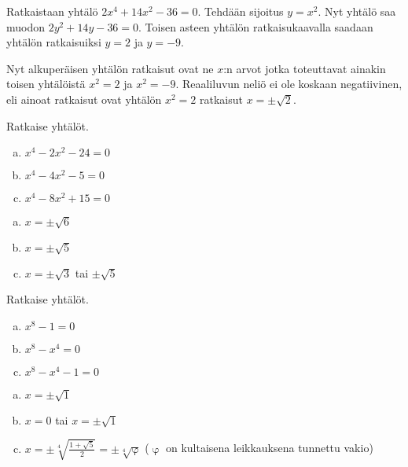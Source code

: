 \begin{esimerkki}
Ratkaistaan yhtälö $2x^4+14x^2-36=0$. Tehdään sijoitus $y = x^2$. Nyt yhtälö saa muodon $2y^2+14y-36 = 0$. Toisen asteen yhtälön ratkaisukaavalla saadaan yhtälön ratkaisuiksi $y = 2$ ja $y = -9$.

Nyt alkuperäisen yhtälön ratkaisut ovat ne $x$:n arvot jotka toteuttavat ainakin toisen yhtälöistä $x^2 = 2$ ja $x^2 = -9$. Reaaliluvun neliö ei ole koskaan negatiivinen, eli ainoat ratkaisut ovat yhtälön $x^2 = 2$ ratkaisut $x = \pm\sqrt{2}$.
\end{esimerkki}

\Harjoitustehtavat

\begin{tehtava}
    Ratkaise yhtälöt.
    \begin{enumerate}[a)]
        \item $x^4 - 2x^2 - 24 = 0$
        \item $x^4 - 4x^2 - 5 = 0$
        \item $x^4 - 8x^2 + 15 = 0$
    \end{enumerate}
    \begin{vastaus}
        \begin{enumerate}[a)]
            \item $x = \pm\sqrt{6}$
            \item $x = \pm\sqrt{5}$
            \item $x = \pm\sqrt{3}$ tai $\pm\sqrt{5}$
        \end{enumerate}
    \end{vastaus}
\end{tehtava}

\begin{tehtava}
    Ratkaise yhtälöt.
    \begin{enumerate}[a)]
        \item $x^8 - 1 = 0$
        \item $x^8 - x^4 = 0$
        \item $x^8 - x^4 - 1 = 0$
    \end{enumerate}
    \begin{vastaus}
        \begin{enumerate}[a)]
            \item $x = \pm\sqrt{1}$
            \item $x = 0$ tai $x = \pm\sqrt{1}$
            \item $x = \pm\sqrt[4]{\frac{1+\sqrt{5}}{2}} = \pm\sqrt[4]{\upvarphi}$ ($\upvarphi$ on kultaisena leikkauksena tunnettu vakio)
        \end{enumerate}
    \end{vastaus}
\end{tehtava}

